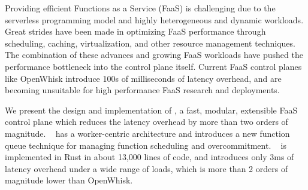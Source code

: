 
Providing efficient Functions as a Service (FaaS) is challenging due to the serverless programming model and highly heterogeneous and dynamic workloads. 
Great strides have been made in optimizing FaaS performance through scheduling, caching, virtualization, and other resource management techniques.
The combination of these advances and growing FaaS workloads have pushed the performance bottleneck into the control plane itself.
Current FaaS control planes like OpenWhisk introduce 100s of milliseconds of latency overhead, and are becoming unsuitable for high performance FaaS research and deployments.

We present the design and implementation of \sysname, a fast, modular, extensible FaaS control plane which reduces the latency overhead by more than two orders of magnitude.
\sysname~ has a worker-centric architecture and introduces a new function queue technique for managing function scheduling and overcommitment. 
\sysname~ is implemented in Rust in about 13,000 lines of code, and introduces only 3ms of latency overhead under a wide range of loads, which is more than 2 orders of magnitude lower than OpenWhisk. 



